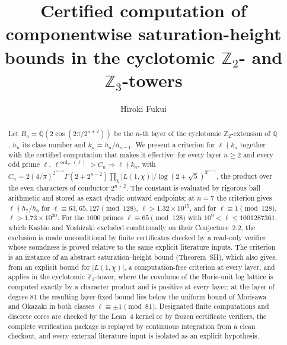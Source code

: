 \documentclass[11pt]{amsart}
\title[Certified saturation-height bounds]{Certified computation of componentwise saturation-height bounds in the cyclotomic $\mathbb{Z}_2$- and $\mathbb{Z}_3$-towers}
\author{Hiroki Fukui}
\theoremstyle{remark}\newtheorem{remark}[theorem]{Remark}
\theoremstyle{definition}\newtheorem{definition}[theorem]{Definition}
\theoremstyle{definition}\newtheorem{algorithm}[theorem]{Algorithm}
\begin{document}
\begin{abstract}
Let $B_n=\mathbb{Q}(2\cos(2\pi/2^{n+2}))$ be the $n$-th layer of the cyclotomic $\mathbb{Z}_2$-extension of $\mathbb{Q}$, $h_n$ its class number and $k_n=h_n/h_{n-1}$. We present a criterion for $\ell\nmid k_n$ together with the certified computation that makes it effective: for every layer $n\ge2$ and every odd prime $\ell$, $\ell^{\,\operatorname{ord}_{2^n}(\ell)}>C_n\Rightarrow\ell\nmid k_n$, with $C_n=2(4/\pi)^{2^{n-2}}\Gamma(2+2^{n-2})\prod_{\chi}|L(1,\chi)|/\log(2+\sqrt5)^{2^{n-1}}$, the product over the even characters of conductor $2^{n+2}$. The constant is evaluated by rigorous ball arithmetic and stored as exact dyadic outward endpoints; at $n=7$ the criterion gives $\ell\nmid h_7/h_6$ for $\ell\equiv63,65,127\pmod{128}$, $\ell>1.32\times10^{15}$, and for $\ell\equiv1\pmod{128}$, $\ell>1.73\times10^{30}$. For the $1000$ primes $\ell\equiv65\pmod{128}$ with $10^9<\ell\le1001287361$, which Kashio and Yoshizaki excluded conditionally on their Conjecture~2.2, the exclusion is made unconditional by finite certificates checked by a read-only verifier whose soundness is proved relative to the same explicit literature inputs. The criterion is an instance of an abstract saturation--height bound (Theorem~SH), which also gives, from an explicit bound for $|L(1,\chi)|$, a computation-free criterion at every layer, and applies in the cyclotomic $\mathbb{Z}_3$-tower, where the covolume of the Horie-unit log lattice is computed exactly by a character product and is positive at every layer; at the layer of degree $81$ the resulting layer-fixed bound lies below the uniform bound of Morisawa and Okazaki in both classes $\ell\equiv\pm1\pmod{81}$. Designated finite computations and discrete cores are checked by the Lean~4 kernel or by frozen certificate verifiers, the complete verification package is replayed by continuous integration from a clean checkout, and every external literature input is isolated as an explicit hypothesis.
\end{abstract}
\maketitle
\tableofcontents %
\end{document}

